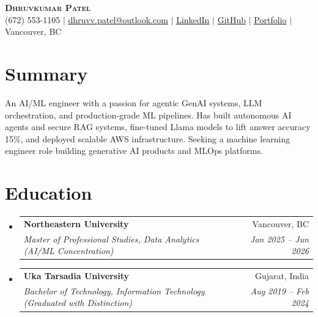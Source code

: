 \documentclass[letterpaper,11pt]{article}
\makeatletter
\newcommand{\resumeSubheading}[4]{
  \vspace{-2pt}\item
    \begin{tabular*}{0.97\textwidth}[t]{l@{\extracolsep{\fill}}r}
      \textbf{#1} & #2 \\
      \textit{\small#3} & \textit{\small #4} \\
    \end{tabular*}\vspace{-7pt}
}
\newcommand{\resumeSubHeadingListStart}{\begin{itemize}[leftmargin=0.15in, label={}]}
\newcommand{\resumeSubHeadingListEnd}{\end{itemize}}
\makeatother
\begin{document}
\begin{center}
    \textbf{\Huge \scshape Dhruvkumar Patel} \\ \vspace{1pt}
    \small (672) 553-1105 $|$ \href{mailto:dhruvv.patel@outlook.com}{\underline{dhruvv.patel@outlook.com}} $|$
    \href{https://www.linkedin.com/in/dhruvkumarpatell/}{\underline{LinkedIn}} $|$
    \href{https://github.com/pateldhruvkumar}{\underline{GitHub}} $|$
    \href{https://dhruvvkumarpatel.vercel.app/}{\underline{Portfolio}} $|$
    Vancouver, BC
\end{center}

\section{Summary}
  \small{An AI/ML engineer with a passion for agentic GenAI systems, LLM orchestration, and production-grade ML pipelines. Has built autonomous AI agents and secure RAG systems, fine-tuned Llama models to lift answer accuracy 15\%, and deployed scalable AWS infrastructure. Seeking a machine learning engineer role building generative AI products and MLOps platforms.}
  \vspace{-4pt}

\section{Education}
  \resumeSubHeadingListStart
    \resumeSubheading
      {Northeastern University}{Vancouver, BC}
      {Master of Professional Studies, Data Analytics (AI/ML Concentration)}{Jan 2025 -- Jun 2026}
    \resumeSubheading
      {Uka Tarsadia University}{Gujarat, India}
      {Bachelor of Technology, Information Technology (Graduated with Distinction)}{Aug 2019 -- Feb 2024}
  \resumeSubHeadingListEnd

\end{document}
